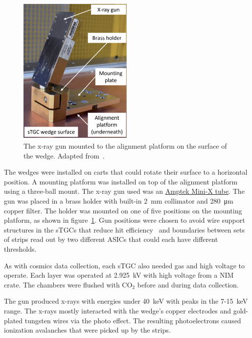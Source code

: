 \begin{figure}
    \centering
    \includegraphics[width = 0.5\textwidth]{figures/xray_setup.png}
    \caption{The x-ray gun mounted to the alignment platform on the surface of the wedge. Adapted from~\cite{lefebvre_precision_2020}.}
    \label{fig:xray_setup}
\end{figure}

The wedges were installed on carts that could rotate their surface to a horizontal position. A mounting platform was installed on top of the alignment platform using a three-ball mount. The x-ray gun used was an \href{https://www.amptek.com/-/media/ametekamptek/documents/resources/specs/mini-x-specifications.pdf?la=en\&revision=512f7eb3-01b3-47fd-864f-5525c850fc6e\&hash=B8B03C0592486E2D91C566C4326F15F5}{Amptek Mini-X tube}. The gun was placed in a brass holder with built-in \SI{2}{mm} collimator and \SI{280}{\micro\meter} copper filter. The holder was mounted on one of five positions on the mounting platform, as shown in figure~\ref{fig:xray_setup}. Gun positions were chosen to avoid wire support structures in the sTGCs that reduce hit efficiency~\cite{lefebvre_thesis} and boundaries between sets of strips read out by two different ASICs that could each have different thresholds. 

As with cosmics data collection, each sTGC also needed gas and high voltage to operate. Each layer was operated at \SI{2.925}{kV} with high voltage from a NIM crate. The chambers were flushed with CO$_2$ before and during data collection.

The gun produced x-rays with energies under \SI{40}{\kilo\electronvolt} with peaks in the 7-\SI{15}{keV} range. The x-rays mostly interacted with the wedge's copper electrodes and gold-plated tungsten wires via the photo effect. The resulting photoelectrons caused ionization avalanches that were picked up by the strips.


